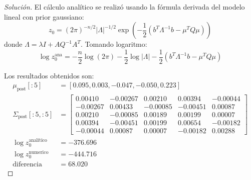\documentclass[12pt,spanish,mexico]{article}
\numberwithin{equation}{section}
\theoremstyle{definition}
\theoremstyle{remark}
\newenvironment{solution}{\begin{proof}[Solución]}{\end{proof}}
\begin{document}
\begin{enumerate}
\begin{solution}
El cálculo analítico se realizó usando la fórmula derivada del modelo lineal con prior gaussiano:
\[
z_0 = (2\pi)^{-n/2} |\Lambda|^{-1/2} \exp\left(-\frac{1}{2}(b^T \Lambda^{-1} b - \mu^T Q \mu)\right)
\]
donde $\Lambda = \lambda I + A Q^{-1} A^T$. Tomando logaritmo:
\[
\log z_0^{\text{ana}} = -\frac{n}{2}\log(2\pi) - \frac{1}{2}\log|\Lambda| - \frac{1}{2}(b^T \Lambda^{-1} b - \mu^T Q \mu)
\]

Los resultados obtenidos son:
\begin{align*}
\mu_{\text{post}}[:5] &= [0.095, 0.003, -0.047, -0.050, 0.223] \\
\Sigma_{\text{post}}[:5,:5] &= \begin{bmatrix}
0.00410 & -0.00267 & 0.00210 & 0.00394 & -0.00044 \\
-0.00267 & 0.00433 & -0.00085 & -0.00451 & 0.00087 \\
0.00210 & -0.00085 & 0.00189 & 0.00199 & 0.00007 \\
0.00394 & -0.00451 & 0.00199 & 0.00654 & -0.00182 \\
-0.00044 & 0.00087 & 0.00007 & -0.00182 & 0.00288
\end{bmatrix} \\
\log z_0^{\text{analítico}} &= -376.696 \\
\log z_0^{\text{numerico}} &= -444.716 \\
\text{diferencia} &= 68.020
\end{align*}


\end{solution}

\end{enumerate}
\end{document}
